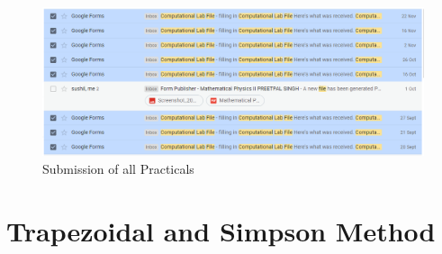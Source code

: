 \documentclass{article}
\begin{document}
\clearpage
\begin{figure}[h]
    \centering
    \includegraphics[width=15cm,height=10cm \textwidth]{Capture.PNG}
\caption{Submission of all Practicals}
\end{figure}
\clearpage
\section{Trapezoidal and Simpson Method}

\end{document}

